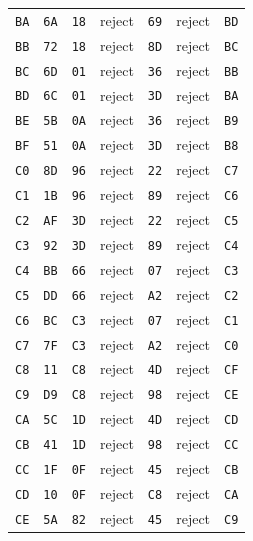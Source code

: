 \begin{longtable}{lllllll}
\texttt{BA} & \texttt{6A} & \texttt{18} & reject & \texttt{69} & reject & \texttt{BD}\\
\texttt{BB} & \texttt{72} & \texttt{18} & reject & \texttt{8D} & reject & \texttt{BC}\\
\texttt{BC} & \texttt{6D} & \texttt{01} & reject & \texttt{36} & reject & \texttt{BB}\\
\texttt{BD} & \texttt{6C} & \texttt{01} & reject & \texttt{3D} & reject & \texttt{BA}\\
\texttt{BE} & \texttt{5B} & \texttt{0A} & reject & \texttt{36} & reject & \texttt{B9}\\
\texttt{BF} & \texttt{51} & \texttt{0A} & reject & \texttt{3D} & reject & \texttt{B8}\\
\texttt{C0} & \texttt{8D} & \texttt{96} & reject & \texttt{22} & reject & \texttt{C7}\\
\texttt{C1} & \texttt{1B} & \texttt{96} & reject & \texttt{89} & reject & \texttt{C6}\\
\texttt{C2} & \texttt{AF} & \texttt{3D} & reject & \texttt{22} & reject & \texttt{C5}\\
\texttt{C3} & \texttt{92} & \texttt{3D} & reject & \texttt{89} & reject & \texttt{C4}\\
\texttt{C4} & \texttt{BB} & \texttt{66} & reject & \texttt{07} & reject & \texttt{C3}\\
\texttt{C5} & \texttt{DD} & \texttt{66} & reject & \texttt{A2} & reject & \texttt{C2}\\
\texttt{C6} & \texttt{BC} & \texttt{C3} & reject & \texttt{07} & reject & \texttt{C1}\\
\texttt{C7} & \texttt{7F} & \texttt{C3} & reject & \texttt{A2} & reject & \texttt{C0}\\
\texttt{C8} & \texttt{11} & \texttt{C8} & reject & \texttt{4D} & reject & \texttt{CF}\\
\texttt{C9} & \texttt{D9} & \texttt{C8} & reject & \texttt{98} & reject & \texttt{CE}\\
\texttt{CA} & \texttt{5C} & \texttt{1D} & reject & \texttt{4D} & reject & \texttt{CD}\\
\texttt{CB} & \texttt{41} & \texttt{1D} & reject & \texttt{98} & reject & \texttt{CC}\\
\texttt{CC} & \texttt{1F} & \texttt{0F} & reject & \texttt{45} & reject & \texttt{CB}\\
\texttt{CD} & \texttt{10} & \texttt{0F} & reject & \texttt{C8} & reject & \texttt{CA}\\
\texttt{CE} & \texttt{5A} & \texttt{82} & reject & \texttt{45} & reject & \texttt{C9}\\

\end{longtable}

